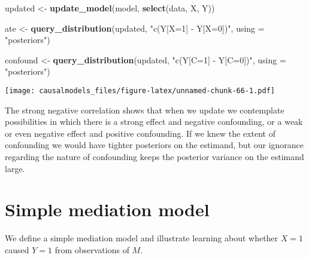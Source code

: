 \documentclass[
  12pt,
]{book}
\newenvironment{Shaded}{\begin{snugshade}}{\end{snugshade}}
\newcommand{\DataTypeTok}[1]{\textcolor[rgb]{0.13,0.29,0.53}{#1}}
\newcommand{\DecValTok}[1]{\textcolor[rgb]{0.00,0.00,0.81}{#1}}
\newcommand{\FloatTok}[1]{\textcolor[rgb]{0.00,0.00,0.81}{#1}}
\newcommand{\KeywordTok}[1]{\textcolor[rgb]{0.13,0.29,0.53}{\textbf{#1}}}
\newcommand{\NormalTok}[1]{#1}
\newcommand{\OperatorTok}[1]{\textcolor[rgb]{0.81,0.36,0.00}{\textbf{#1}}}
\newcommand{\StringTok}[1]{\textcolor[rgb]{0.31,0.60,0.02}{#1}}
\begin{document}
\begin{Shaded}
\begin{Highlighting}[]
\NormalTok{updated  <-}\StringTok{ }\KeywordTok{update_model}\NormalTok{(model, }\KeywordTok{select}\NormalTok{(data, X, Y))}

\NormalTok{ate <-}\StringTok{ }
\StringTok{  }\KeywordTok{query_distribution}\NormalTok{(updated, }\StringTok{"c(Y[X=1] - Y[X=0])"}\NormalTok{, }\DataTypeTok{using =} \StringTok{"posteriors"}\NormalTok{)}

\NormalTok{confound <-}\StringTok{ }
\StringTok{  }\KeywordTok{query_distribution}\NormalTok{(updated, }\StringTok{"c(Y[C=1] - Y[C=0])"}\NormalTok{, }\DataTypeTok{using =} \StringTok{"posteriors"}\NormalTok{)}
\end{Highlighting}
\end{Shaded}

\texttt{[image: causalmodels\_files/figure-latex/unnamed-chunk-66-1.pdf]}

The strong negative correlation shows that when we update we contemplate possibilities in which there is a strong effect and negative confounding, or a weak or even negative effect and positive confounding. If we knew the extent of confounding we would have tighter posteriors on the estimand, but our ignorance regarding the nature of confounding keeps the posterior variance on the estimand large.

\hypertarget{simple-mediation-model}{%
\section{Simple mediation model}\label{simple-mediation-model}}

We define a simple mediation model and illustrate learning about whether \(X=1\) caused \(Y=1\) from observations of \(M\).

\begin{Shaded}
\end{Shaded}
\end{document}
